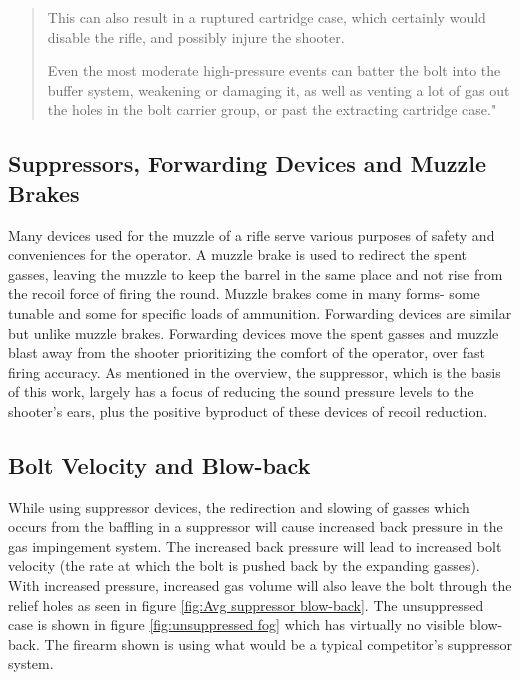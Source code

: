 \begin{quote}
	
	
	This can also result in a ruptured cartridge case, which certainly would disable the rifle, and possibly injure the shooter.
	
	
	
	Even the most moderate high-pressure events can batter the bolt into the buffer system, weakening or damaging it, as well as venting a lot of gas out the holes in the bolt carrier group, or past the extracting cartridge case."
	
\end{quote}






\subsection{Suppressors, Forwarding Devices and Muzzle Brakes}

Many devices used for the muzzle of a rifle serve various purposes of safety and conveniences for the operator. A muzzle brake is used to redirect the spent gasses, leaving the muzzle to keep the barrel in the same place and not rise from the recoil force of firing the round. Muzzle brakes come in many forms- some tunable and some for specific loads of ammunition. Forwarding devices are similar but unlike muzzle brakes. Forwarding devices move the spent gasses and muzzle blast away from the shooter prioritizing the comfort of the operator, over fast firing accuracy. As mentioned in the overview, the suppressor, which is the basis of this work, largely has a focus of reducing the sound pressure levels to the shooter's ears, plus the positive byproduct of these devices of recoil reduction.\cite{recoilweb2022}\cite{opticsplanet2021}\cite{nraila2022}





\subsection{Bolt Velocity and Blow-back}
While using suppressor devices, the redirection and slowing of gasses which occurs from the baffling in a suppressor will cause increased back pressure in the gas impingement system. The increased back pressure will lead to increased bolt velocity (the rate at which the bolt is pushed back by the expanding gasses). With increased pressure, increased gas volume will also leave the bolt through the relief holes as seen in figure \ref{fig:Avg suppressor blow-back}. The unsuppressed case is shown in figure \ref{fig:unsuppressed fog} which has virtually no visible blow-back. The firearm shown is using what would be a typical competitor's suppressor system.


